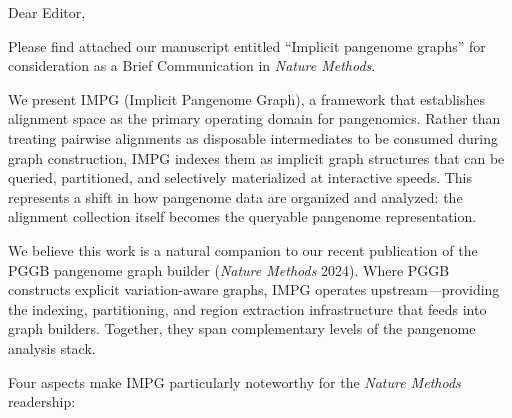 Dear Editor,

Please find attached our manuscript entitled ``Implicit pangenome graphs'' for consideration as a Brief Communication in \textit{Nature Methods}.

We present IMPG (Implicit Pangenome Graph), a framework that establishes alignment space as the primary operating domain for pangenomics. Rather than treating pairwise alignments as disposable intermediates to be consumed during graph construction, IMPG indexes them as implicit graph structures that can be queried, partitioned, and selectively materialized at interactive speeds. This represents a shift in how pangenome data are organized and analyzed: the alignment collection itself becomes the queryable pangenome representation.

We believe this work is a natural companion to our recent publication of the PGGB pangenome graph builder (\textit{Nature Methods} 2024). Where PGGB constructs explicit variation-aware graphs, IMPG operates upstream---providing the indexing, partitioning, and region extraction infrastructure that feeds into graph builders. Together, they span complementary levels of the pangenome analysis stack.

Four aspects make IMPG particularly noteworthy for the \textit{Nature Methods} readership:


